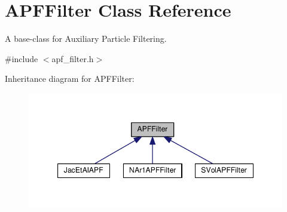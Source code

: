 \hypertarget{classAPFFilter}{}\section{A\+P\+F\+Filter Class Reference}
\label{classAPFFilter}


A base-\/class for Auxiliary Particle Filtering.  




{\ttfamily \#include $<$apf\+\_\+filter.\+h$>$}



Inheritance diagram for A\+P\+F\+Filter\+:\nopagebreak
\begin{figure}[H]
\begin{center}
\leavevmode
\includegraphics[width=347pt]{classAPFFilter__inherit__graph}
\end{center}
\end{figure}
